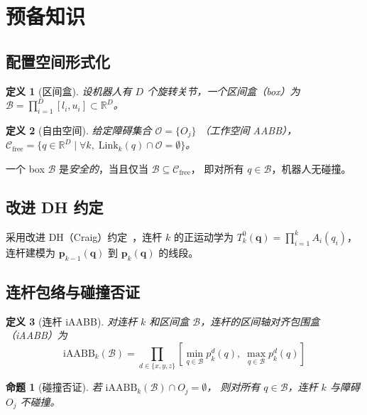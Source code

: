 \documentclass[11pt,a4paper]{article}
\newtheorem{proposition}{命题}[section]
\newtheorem{definition}{定义}[section]
\begin{document}
\section{预备知识}
\label{sec:prelim}

\subsection{配置空间形式化}

\begin{definition}[区间盒]
设机器人有 $D$ 个旋转关节，一个\emph{区间盒}（box）为
$\mathcal{B} = \prod_{i=1}^{D}[l_i, u_i] \subset \mathbb{R}^D$。
\end{definition}

\begin{definition}[自由空间]
给定障碍集合 $\mathcal{O} = \{O_j\}$ （工作空间 AABB），
$\mathcal{C}_{\mathrm{free}} = \{q \in \mathbb{R}^D \mid \forall k,\; \mathrm{Link}_k(q) \cap \mathcal{O} = \emptyset\}$。
\end{definition}

一个 box $\mathcal{B}$ 是\emph{安全的}，当且仅当 $\mathcal{B} \subseteq \mathcal{C}_{\mathrm{free}}$，
即对所有 $q \in \mathcal{B}$，机器人无碰撞。

\subsection{改进 DH 约定}

采用改进 DH（Craig）约定~\cite{craig2005introduction}，连杆 $k$ 的正运动学为
$T_k^0(\mathbf{q}) = \prod_{i=1}^{k} A_i(q_i)$，
连杆建模为 $\mathbf{p}_{k-1}(\mathbf{q})$ 到 $\mathbf{p}_k(\mathbf{q})$ 的线段。

\subsection{连杆包络与碰撞否证}

\begin{definition}[连杆 iAABB]
对连杆 $k$ 和区间盒 $\mathcal{B}$，连杆的\emph{区间轴对齐包围盒}（iAABB）为
\begin{equation}
\mathrm{iAABB}_k(\mathcal{B}) = \prod_{d \in \{x,y,z\}}
\left[\min_{q \in \mathcal{B}} p_k^d(q),\; \max_{q \in \mathcal{B}} p_k^d(q)\right]
\end{equation}
\end{definition}

\begin{proposition}[碰撞否证]
若 $\mathrm{iAABB}_k(\mathcal{B}) \cap O_j = \emptyset$，
则对所有 $q \in \mathcal{B}$，连杆 $k$ 与障碍 $O_j$ 不碰撞。
\end{proposition}
\end{document}
